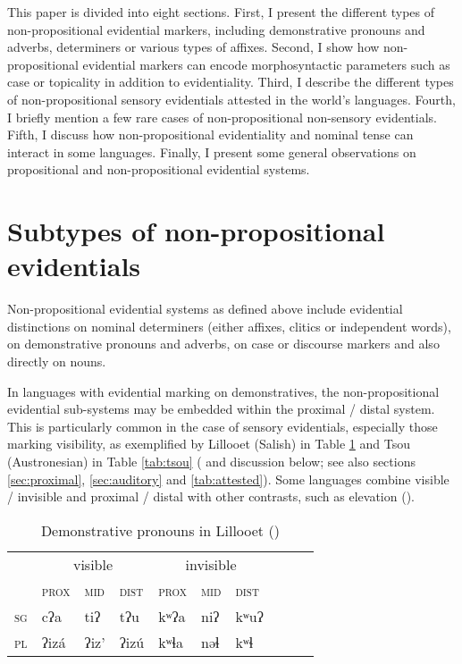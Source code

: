\documentclass[oneside,a4paper,11pt]{article}
\newcommand{\ipa}[1]{{\phon \mbox{#1}}} %
\begin{document}
 
This paper is divided into eight sections.  First, I present the different types of   non-propositional evidential markers, including demonstrative pronouns and adverbs, determiners or various types of affixes. Second,  I show how non-propositional evidential markers can encode  morphosyntactic parameters such as case or topicality in addition to evidentiality. Third, I describe the different types of non-propositional sensory evidentials attested in the world's languages. Fourth, I briefly mention a few rare cases of non-propositional non-sensory evidentials. Fifth, I discuss how non-propositional evidentiality and nominal tense can interact in some languages. Finally, I present some general observations on propositional and non-propositional evidential systems.

\section{Subtypes of non-propositional evidentials} \label{sec:subtypes}
Non-propositional evidential systems as defined above include evidential distinctions on nominal determiners (either affixes, clitics or independent words),  on demonstrative pronouns and adverbs, on case or discourse markers and also directly on nouns.

In languages with evidential marking on demonstratives, the  non-propositional evidential sub-systems may be embedded within the proximal / distal system.  This is particularly common in the case of sensory evidentials, especially those marking visibility, as exemplified by Lillooet (Salish) in Table \ref{tab:statimcets.pro} and Tsou (Austronesian) in Table \ref{tab:tsou} (\citealt{tung64tsou, yang00tsou.case} and discussion below; see also sections \ref{sec:proximal}, \ref{sec:auditory} and \ref{tab:attested}).  Some languages combine visible / invisible and proximal / distal with other contrasts, such as elevation (\citealt{schapper14elevation}).

\begin{table}[H]
\caption{Demonstrative pronouns in Lillooet (\citealt[168-9]{eijk97lillooet})} \label{tab:statimcets.pro} \centering 
\begin{tabular}{l|lll|llllll}
\toprule
& \multicolumn{3}{c}{visible} & \multicolumn{3}{c}{invisible} \\
&\textsc{prox} & \textsc{mid} & \textsc{dist}&\textsc{prox} & \textsc{mid} & \textsc{dist} \\
\midrule
\textsc{sg} & \ipa{cʔa} & \ipa{tiʔ} & \ipa{tʔu} & \ipa{kʷʔa} & \ipa{niʔ} & \ipa{kʷuʔ}  \\
\textsc{pl} & \ipa{ʔizá} & \ipa{ʔiz'} & \ipa{ʔizú} & \ipa{kʷɬa} & \ipa{nəɬ} & \ipa{kʷɬ} \\
\bottomrule
\end{tabular}
\end{table}
\end{document}
